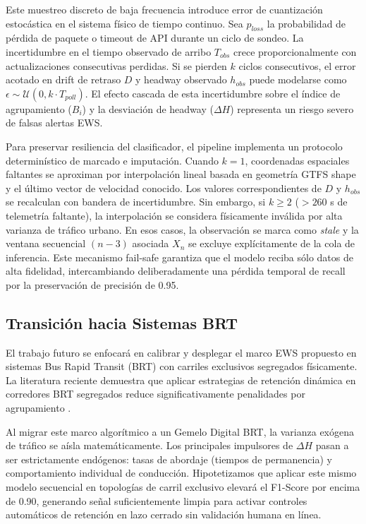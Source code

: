 \documentclass[journal,twocolumn]{IEEEtran}
\begin{document}
Este muestreo discreto de baja frecuencia introduce error de cuantización estocástica en el sistema físico de tiempo continuo. Sea $p_{loss}$ la probabilidad de pérdida de paquete o timeout de API durante un ciclo de sondeo. La incertidumbre en el tiempo observado de arribo $T_{obs}$ crece proporcionalmente con actualizaciones consecutivas perdidas. Si se pierden $k$ ciclos consecutivos, el error acotado en drift de retraso $D$ y headway observado $h_{obs}$ puede modelarse como $\epsilon \sim \mathcal{U}(0, k \cdot T_{poll})$. El efecto cascada de esta incertidumbre sobre el índice de agrupamiento ($B_i$) y la desviación de headway ($\Delta H$) representa un riesgo severo de falsas alertas EWS.

Para preservar resiliencia del clasificador, el pipeline implementa un protocolo determinístico de marcado e imputación. Cuando $k=1$, coordenadas espaciales faltantes se aproximan por interpolación lineal basada en geometría GTFS shape y el último vector de velocidad conocido. Los valores correspondientes de $D$ y $h_{obs}$ se recalculan con bandera de incertidumbre. Sin embargo, si $k \ge 2$ ($>260$ s de telemetría faltante), la interpolación se considera físicamente inválida por alta varianza de tráfico urbano. En esos casos, la observación se marca como \textit{stale} y la ventana secuencial $(n-3)$ asociada $X_n$ se excluye explícitamente de la cola de inferencia. Este mecanismo fail-safe garantiza que el modelo reciba sólo datos de alta fidelidad, intercambiando deliberadamente una pérdida temporal de recall por la preservación de precisión de 0.95.

\subsection{Transición hacia Sistemas BRT}
El trabajo futuro se enfocará en calibrar y desplegar el marco EWS propuesto en sistemas Bus Rapid Transit (BRT) con carriles exclusivos segregados físicamente. La literatura reciente demuestra que aplicar estrategias de retención dinámica en corredores BRT segregados reduce significativamente penalidades por agrupamiento \cite{10,29}.

Al migrar este marco algorítmico a un Gemelo Digital BRT, la varianza exógena de tráfico se aísla matemáticamente. Los principales impulsores de $\Delta H$ pasan a ser estrictamente endógenos: tasas de abordaje (tiempos de permanencia) y comportamiento individual de conducción. Hipotetizamos que aplicar este mismo modelo secuencial en topologías de carril exclusivo elevará el F1-Score por encima de 0.90, generando señal suficientemente limpia \cite{30} para activar controles automáticos de retención en lazo cerrado \cite{10} sin validación humana en línea.
\end{document}
